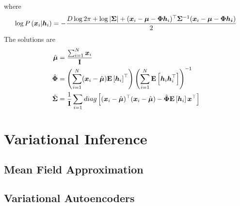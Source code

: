 where
\begin{align*}
	\log P\left(\boldsymbol{x}_i|\boldsymbol{h}_i\right)=-\frac{D\log 2\pi+\log\left\vert \mathbf{\Sigma} \right\vert+(\boldsymbol{x}_i-\boldsymbol{\mu}-\mathbf{\Phi}\boldsymbol{h}_i)^\top\mathbf{\Sigma}^{-1}(\boldsymbol{x}_i-\boldsymbol{\mu}-\mathbf{\Phi}\boldsymbol{h_i})}{2}
\end{align*}
The solutions are
\begin{align*}
	\hat{\boldsymbol{\mu}}&=\frac{\sum_{i=1}^N\boldsymbol{x}_i}{\mathbf{I}} \\
	\hat{\mathbf{\Phi}}&=\left(\sum_{i=1}^N(\boldsymbol{x}_i-\hat{\boldsymbol{\mu}})\mathbf{E}\left[\boldsymbol{h}_i\right]^\top\right)\left(\sum_{i=1}^N\mathbf{E}\left[\boldsymbol{h}_i\boldsymbol{h}_i^\top\right]\right)^{-1} \\
	\hat{\mathbf{\Sigma}}&=\frac{1}{\mathbf{I}}\sum_{i=1}diag\left[(\boldsymbol{x}_i-\hat{\boldsymbol{\mu}})^\top(\boldsymbol{x}_i-\hat{\boldsymbol{\mu}})-\hat{\mathbf{\Phi}}\mathbf{E}\left[\boldsymbol{h}_i\right]\boldsymbol{x}^\top\right]
\end{align*}

\section{Variational Inference}

\subsection{Mean Field Approximation}

\subsection{Variational Autoencoders}
